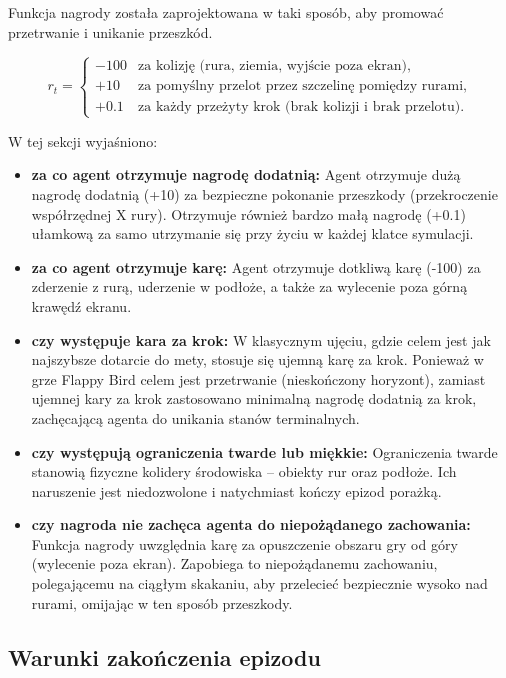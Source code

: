 \documentclass[12pt]{article}
\begin{document}
Funkcja nagrody została zaprojektowana w taki sposób, aby promować przetrwanie i unikanie przeszkód. 

\begin{equation}
    r_t = \begin{cases} 
    -100 & \text{za kolizję (rura, ziemia, wyjście poza ekran),} \\
    +10 & \text{za pomyślny przelot przez szczelinę pomiędzy rurami,} \\
    +0.1 & \text{za każdy przeżyty krok (brak kolizji i brak przelotu).}
    \end{cases}
\end{equation}

W tej sekcji wyjaśniono:
\begin{itemize}
    \item \textbf{za co agent otrzymuje nagrodę dodatnią:} Agent otrzymuje dużą nagrodę dodatnią (+10) za bezpieczne pokonanie przeszkody (przekroczenie współrzędnej X rury). Otrzymuje również bardzo małą nagrodę (+0.1) ułamkową za samo utrzymanie się przy życiu w każdej klatce symulacji.
    \item \textbf{za co agent otrzymuje karę:} Agent otrzymuje dotkliwą karę (-100) za zderzenie z rurą, uderzenie w podłoże, a także za wylecenie poza górną krawędź ekranu.
    \item \textbf{czy występuje kara za krok:} W klasycznym ujęciu, gdzie celem jest jak najszybsze dotarcie do mety, stosuje się ujemną karę za krok. Ponieważ w grze Flappy Bird celem jest przetrwanie (nieskończony horyzont), zamiast ujemnej kary za krok zastosowano minimalną nagrodę dodatnią za krok, zachęcającą agenta do unikania stanów terminalnych.
    \item \textbf{czy występują ograniczenia twarde lub miękkie:} Ograniczenia twarde stanowią fizyczne kolidery środowiska -- obiekty rur oraz podłoże. Ich naruszenie jest niedozwolone i natychmiast kończy epizod porażką.
    \item \textbf{czy nagroda nie zachęca agenta do niepożądanego zachowania:} Funkcja nagrody uwzględnia karę za opuszczenie obszaru gry od góry (wylecenie poza ekran). Zapobiega to niepożądanemu zachowaniu, polegającemu na ciągłym skakaniu, aby przelecieć bezpiecznie wysoko nad rurami, omijając w ten sposób przeszkody.
\end{itemize}

\subsection{Warunki zakończenia epizodu}
\end{document}
